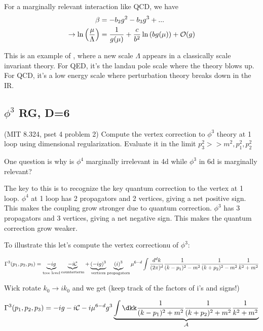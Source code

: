 \documentclass[9pt]{scrartcl}
\begin{document}
For a marginally relevant interaction like QCD, we have
\begin{align}
	\beta &= - b_2 g^2 - b_3 g^3  + ... \\
	\rightarrow \ln \left({\mu \over \Lambda} \right) &= {1 \over g(\mu)} + {c \over b^2} \ln \left({b g(\mu)}\right) + \mathcal{O}(g) \\
	\end{align}

This is an example of , where a new scale $\Lambda$ appears in a classically scale invariant theory.
For QED, it's the landau pole scale where the theory blows up. For QCD, it's a low energy scale where perturbation theory breaks down in the IR.

\subsection{$\phi^3$ RG, D=6}
\begin{problem} (MIT 8.324, pset 4 problem 2)
	Compute the vertex correction to $\phi^3$  theory at 1 loop using dimensional regularization.  Evaluate it in the limit $p_3^2 >> m^2, p_1^2, p_2^2$
	\end{problem}

One question is why is $\phi^4$ marginally irrelevant in 4d while $\phi^3$ in 6d is marginally relevant?

The key to this is to recognize the key quantum correction to the vertex at 1 loop.  $\phi^4$ at 1 loop has 2 propagators and 2 vertices, giving a net positive sign.  This makes the coupling grow stronger due to quantum correction.  $\phi^3$ has 3 propagators and 3 vertices, giving a net negative sign.  This makes the quantum correction grow weaker.

To illustrate this let's compute the vertex correctionu of $\phi^3$:

\begin{align}
	\Gamma^{3}(p_1, p_2, p_3) = \underbrace{- i g}_{\text{tree level}}  \underbrace{ - i \mathcal{C}}_{\text{counterterm}} + \underbrace{(-ig)^3}_{\text{vertices}} \underbrace{(i)^3}_{\text{propagators}} \mu^{6-d} \int {d^d k \over (2 \pi)^d} {1 \over (k-p_1)^2 - m^2} {1 \over (k + p_2)^2 - m^2} {1 \over k^2 + m^2}
\end{align}

Wick rotate $k_0 \rightarrow i k_0$ and we get (keep track of the factors of i's and signs!)

\begin{align}
	\Gamma^{3}(p_1, p_2, p_3) = -ig -i \mathcal{C} - i \mu^{6-d} g^3 \underbrace{{\int \dkk} {1 \over (k-p_1)^2 + m^2} {1 \over (k + p_2)^2 + m^2} {1 \over k^2 + m^2}}_{\mathcal{A}}
\end{align}
\end{document}
